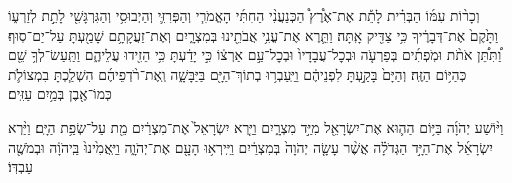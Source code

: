 \documentclass[twoside, openany, parskip=half, 11pt]{book}
\begin{document}
וְכָר֨וֹת עִמּ֜וֹ הַבְּרִ֗ית לָתֵ֡ת אֶת־אֶ֩רֶץ֩ הַכְּנַעֲנִ֨י הַחִתִּ֜י הָאֱמֹרִ֧י וְהַפְּרִזִּ֛י וְהַיְבוּסִ֥י וְהַגִּרְגָּשִׁ֖י לָתֵ֣ת לְזַרְע֑וֹ וַתָּ֙קֶם֙ אֶת־דְּבָרֶ֔יךָ כִּ֥י צַדִּ֖יק אָֽתָּה׃ וַתֵּ֛רֶא אֶת־עֳנִ֥י אֲבֹתֵ֖ינוּ בְּמִצְרָ֑יִם וְאֶת־זַעֲקָתָ֥ם שָׁמַ֖עְתָּ עַל־יַם־סֽוּף׃ וַ֠תִּתֵּ֠ן אֹתֹ֨ת וּמֹֽפְתִ֜ים בְּפַרְעֹ֤ה וּבְכׇל־עֲבָדָיו֙ וּבְכׇל־עַ֣ם אַרְצ֔וֹ כִּ֣י יָדַ֔עְתָּ כִּ֥י הֵזִ֖ידוּ עֲלֵיהֶ֑ם וַתַּֽעַשׂ־לְךָ֥ שֵׁ֖ם כְּהַיּ֥וֹם הַזֶּֽה׃
וְהַיָּם֙ בָּקַ֣עְתָּ לִפְנֵיהֶ֔ם וַיַּֽעַבְר֥וּ בְתוֹךְ־הַיָּ֖ם בַּיַּבָּשָׁ֑ה וְֽאֶת־רֹ֨דְפֵיהֶ֜ם הִשְׁלַ֧כְתָּ בִמְצוֹלֹ֛ת כְּמוֹ־אֶ֖בֶן בְּמַ֥יִם עַזִּֽים׃

וַיּ֨וֹשַׁע
 יְהֹוָ֜ה בַּיּ֥וֹם הַה֛וּא אֶת־יִשְׂרָאֵ֖ל מִיַּ֣ד מִצְרָ֑יִם וַיַּ֤רְא יִשְׂרָאֵל֙ אֶת־מִצְרַ֔יִם מֵ֖ת עַל־שְׂפַ֥ת הַיָּֽם׃  
וַיַּ֨רְא יִשְׂרָאֵ֜ל אֶת־הַיָּ֣ד הַגְּדֹלָ֗ה אֲשֶׁ֨ר עָשָׂ֤ה יְהֹוָה֙ בְּמִצְרַ֔יִם וַיִּֽירְא֥וּ הָעָ֖ם אֶת־יְהֹוָ֑ה וַיַּֽאֲמִ֙ינוּ֙ בַּֽיהֹוָ֔ה וּבְמֹשֶׁ֖ה עַבְדּֽוֹ׃
\end{document}
